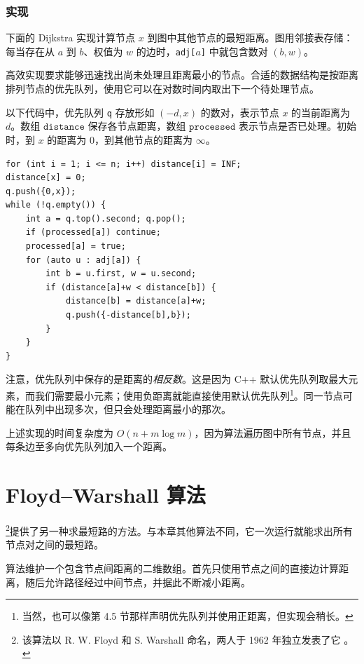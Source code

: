 \subsubsection{实现}

下面的 Dijkstra 实现计算节点 $x$ 到图中其他节点的最短距离。图用邻接表存储：每当存在从 $a$ 到 $b$、权值为 $w$ 的边时，\texttt{adj[$a$]} 中就包含数对 $(b,w)$。

高效实现要求能够迅速找出尚未处理且距离最小的节点。合适的数据结构是按距离排列节点的优先队列，使用它可以在对数时间内取出下一个待处理节点。

以下代码中，优先队列 \texttt{q} 存放形如 $(-d,x)$ 的数对，表示节点 $x$ 的当前距离为 $d$。数组 $\texttt{distance}$ 保存各节点距离，数组 $\texttt{processed}$ 表示节点是否已处理。初始时，到 $x$ 的距离为 $0$，到其他节点的距离为 $\infty$。

\begin{lstlisting}
for (int i = 1; i <= n; i++) distance[i] = INF;
distance[x] = 0;
q.push({0,x});
while (!q.empty()) {
    int a = q.top().second; q.pop();
    if (processed[a]) continue;
    processed[a] = true;
    for (auto u : adj[a]) {
        int b = u.first, w = u.second;
        if (distance[a]+w < distance[b]) {
            distance[b] = distance[a]+w;
            q.push({-distance[b],b});
        }
    }
}
\end{lstlisting}

注意，优先队列中保存的是距离的\emph{相反数}。这是因为 C++ 默认优先队列取最大元素，而我们需要最小元素；使用负距离就能直接使用默认优先队列\footnote{当然，也可以像第 4.5 节那样声明优先队列并使用正距离，但实现会稍长。}。同一节点可能在队列中出现多次，但只会处理距离最小的那次。

上述实现的时间复杂度为 $O(n+m\log m)$，因为算法遍历图中所有节点，并且每条边至多向优先队列加入一个距离。

\section{Floyd--Warshall 算法}


\footnote{该算法以 R. W. Floyd 和 S. Warshall 命名，两人于 1962 年独立发表了它 \cite{flo62,war62}。}提供了另一种求最短路的方法。与本章其他算法不同，它一次运行就能求出所有节点对之间的最短路。

算法维护一个包含节点间距离的二维数组。首先只使用节点之间的直接边计算距离，随后允许路径经过中间节点，并据此不断减小距离。

